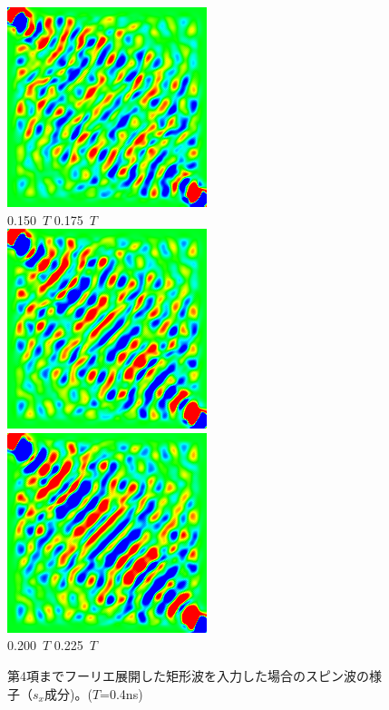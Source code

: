 \documentclass[a4j, twocolumn]{jsarticle}
\begin{document}
\begin{figure}
\includegraphics[width=0.4\hsize]{./figures/capture/sqr/sinsqr128_32i_l_dif_7068} \\
0.150\ $T$ \hspace*{0.25\hsize} 0.175\ $T$  \vspace{5pt}\\
\includegraphics[width=0.4\hsize]{./figures/capture/sqr/sinsqr128_32i_l_dif_7069} \ 
\includegraphics[width=0.4\hsize]{./figures/capture/sqr/sinsqr128_32i_l_dif_7070} \\
0.200\ $T$ \hspace*{0.25\hsize} 0.225\ $T$  \vspace{5pt}\\
\caption{
第4項までフーリエ展開した矩形波を入力した場合のスピン波の様子（$s_{x}$成分)。($T$=0.4ns)
}
\label{fig:waves4xsqr}
\end{figure}
\end{document}
